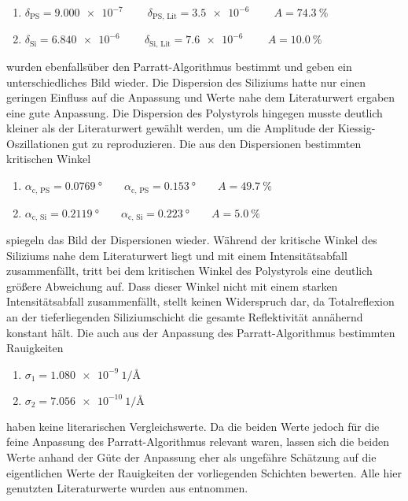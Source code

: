     \begin{enumerate}
      \item $\delta_{\text{PS}}=\SI{9.000e-7}{} \qquad \delta_{\text{PS, Lit}}=\SI{3.5e-6}{} \qquad  A=\SI{74.3}{\percent}$
      \item $\delta_{\text{Si}}=\SI{6.840e-6}{} \qquad \delta_{\text{Si, Lit}}=\SI{7.6e-6}{} \qquad  A=\SI{10.0}{\percent}$
    \end{enumerate}
    
    wurden ebenfallsüber den Parratt-Algorithmus bestimmt und geben ein unterschiedliches Bild wieder. Die Dispersion des Siliziums hatte nur einen geringen Einfluss auf die Anpassung und Werte nahe dem 
    Literaturwert ergaben eine gute Anpassung. Die Dispersion des Polystyrols hingegen musste deutlich kleiner als der Literaturwert gewählt werden, um die Amplitude der Kiessig-Oszillationen 
    gut zu reproduzieren.
    Die aus den Dispersionen bestimmten kritischen Winkel

    \begin{enumerate}
      \item $\alpha_{\text{c, PS}} = \SI{0.0769}{\degree} \qquad \alpha_{\text{c, PS}} = \SI{0.153}{\degree} \qquad A=\SI{49.7}{\percent}$
      \item $\alpha_{\text{c, Si}} = \SI{0.2119}{\degree} \qquad \alpha_{\text{c, Si}} = \SI{0.223}{\degree} \qquad A=\SI{5.0}{\percent}$
    \end{enumerate}

    spiegeln das Bild der Dispersionen wieder. Während der kritische Winkel des Siliziums nahe dem Literaturwert liegt und mit einem Intensitätsabfall zusammenfällt, tritt bei dem kritischen Winkel des
    Polystyrols eine deutlich größere Abweichung auf. Dass dieser Winkel nicht mit einem starken Intensitätsabfall zusammenfällt, stellt keinen Widerspruch dar, da Totalreflexion an der tieferliegenden
    Siliziumschicht die gesamte Reflektivität annähernd konstant hält.
    Die auch aus der Anpassung des Parratt-Algorithmus bestimmten Rauigkeiten 

    \begin{enumerate}
      \item $\sigma_1=\SI{1.080e-9}{1\per\angstrom}$
      \item $\sigma_2=\SI{7.056e-10}{1\per\angstrom}$
    \end{enumerate}

    haben keine literarischen Vergleichswerte. Da die beiden Werte jedoch für die feine Anpassung des Parratt-Algorithmus relevant waren, lassen sich die beiden Werte anhand der Güte der Anpassung eher 
    als ungefähre Schätzung auf die eigentlichen Werte der Rauigkeiten der vorliegenden Schichten bewerten. Alle hier genutzten Literaturwerte wurden aus \cite{tolan_x-ray_1999} entnommen.

    
    
